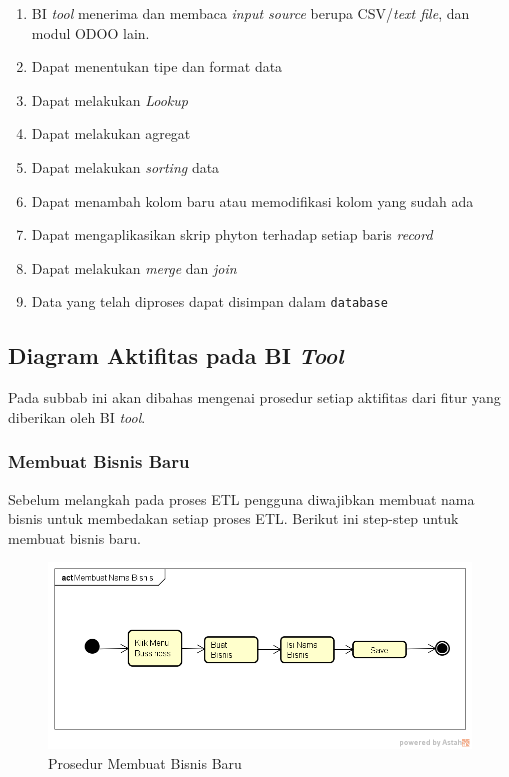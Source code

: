 	\begin{enumerate}
		\item BI \textit{tool} menerima dan membaca \textit{input source} berupa CSV/\textit{text file}, dan modul ODOO lain.
		\item Dapat menentukan tipe dan format data
		\item Dapat melakukan \textit{Lookup}
		\item Dapat melakukan agregat
		\item Dapat melakukan \textit{sorting} data
		\item Dapat menambah kolom baru atau memodifikasi kolom yang sudah ada
		\item Dapat mengaplikasikan skrip phyton terhadap setiap baris \textit{record}
		\item Dapat melakukan \textit{merge} dan \textit{join}
		\item Data yang telah diproses dapat disimpan dalam \texttt{database}
	\end{enumerate}
	
\subsection{Diagram Aktifitas pada BI \textit{Tool}}
	Pada subbab ini akan dibahas mengenai prosedur setiap aktifitas dari fitur yang diberikan oleh BI \textit{tool}.
	
	\subsubsection{Membuat Bisnis Baru}
	Sebelum melangkah pada proses ETL pengguna diwajibkan membuat nama bisnis untuk membedakan setiap proses ETL.
	Berikut ini step-step untuk membuat bisnis baru.
	\begin{figure}[h]
	\centering
	\includegraphics[scale=0.7]{Gambar/Membuat-Nama-Bisnis}
	\caption{Prosedur Membuat Bisnis Baru}
	\end{figure}
	
